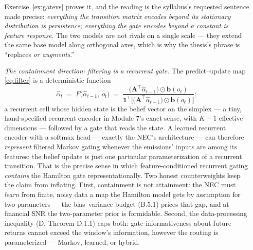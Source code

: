 \documentclass[11pt]{article}
\numberwithin{equation}{section}
\theoremstyle{plain}
\theoremstyle{definition}
\theoremstyle{remark}
\newcommand{\T}{\top}
\newcommand{\bA}{\bm{A}}
\newcommand{\alh}{\hat{\alpha}}
\begin{document}
Exercise~\ref{ex:gatevs} proves it, and the reading is the syllabus's requested sentence made precise: \emph{everything the transition matrix encodes beyond its stationary distribution is persistence; everything the gate encodes beyond a constant is feature response.} The two models are not rivals on a single scale --- they extend the same base model along orthogonal axes, which is why the thesis's phrase is ``replaces \emph{or augments}.''

\emph{The containment direction: filtering is a recurrent gate.} The predict--update map \eqref{eq:filter} is a deterministic function
\begin{equation}
\alh_t \;=\; F\big( \alh_{t-1},\, o_t \big)
\;=\; \frac{ \big(\bA^\T \alh_{t-1}\big) \odot \bm b(o_t) }{ \bm 1^\T \big[ \big(\bA^\T \alh_{t-1}\big) \odot \bm b(o_t) \big] } :
\label{eq:beliefrnn}
\end{equation}
a recurrent cell whose hidden state is the belief vector on the simplex --- a tiny, hand-specified recurrent encoder in Module 7's exact sense, with $K - 1$ effective dimensions --- followed by a gate that reads the state. A learned recurrent encoder with a softmax head --- exactly the NEC's architecture --- can therefore \emph{represent} filtered Markov gating whenever the emissions' inputs are among its features: the belief update is just one particular parameterization of a recurrent transition. That is the precise sense in which feature-conditioned recurrent gating \emph{contains} the Hamilton gate representationally. Two honest counterweights keep the claim from inflating. First, containment is not attainment: the NEC must \emph{learn} from finite, noisy data a map the Hamilton model gets by assumption for two parameters --- the bias--variance budget (B.5.1) prices that gap, and at financial SNR the two-parameter prior is formidable. Second, the data-processing inequality (D, Theorem D.1.1) caps both: gate informativeness about future returns cannot exceed the window's information, however the routing is parameterized --- Markov, learned, or hybrid.
\end{document}
